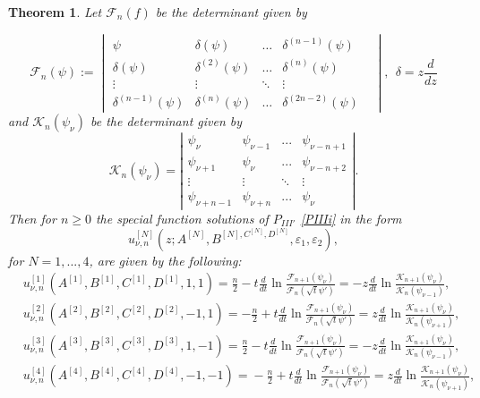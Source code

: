 \documentclass[12pt]{article}
\def\F{\mathcal{F}}
\def\K{\mathcal{K}}
\newtheorem{mydef}{Theorem}[section]
\numberwithin{figure}{section}
\numberwithin{equation}{section}
\numberwithin{table}{section}
\begin{document}
\begin{mydef}
Let $\F_{n}(f)$ be the determinant given by

\[
\mathcal{F}_n(\psi)\!:=\!\begin{vmatrix}
\psi & \delta(\psi) &\hdots& \delta^{(n-1)}(\psi) \\
\delta(\psi) & \delta^{(2)}(\psi) &\hdots& \delta^{(n)}(\psi)  \\
\vdots &\vdots & \ddots & \vdots & \\
\delta^{(n-1)}(\psi) & \delta^{(n)}(\psi) &\hdots& \delta^{(2n-2)}(\psi)
\end{vmatrix},~~\delta=z\frac{d}{dz}
\]
and $\mathcal{K}_n(\psi_\nu)$ be the determinant given by
\[
\mathcal{K}_n(\psi_\nu)\!=\!\left| \begin{array}{cccc}
\psi_{\nu} & \psi_{\nu-1} &  ...& \psi_{\nu-n+1} \\
\psi_{\nu+1} & \psi_{\nu} &  ...& \psi_{\nu-n+2} \\
\vdots &\vdots & \ddots & \vdots  \\
\psi_{\nu+n-1} & \psi_{\nu+n} & ...& \psi_{\nu}  \end{array} \right|.
\]
Then for $n\geq0$ the special function solutions of $P_{III'}$ \eqref{PIIIi} in the form $$u^{[N]}_{\nu,n}(z;A^{[N]},B^{[N],C^{[N]},D^{[N]}},\varepsilon_1,\varepsilon_2),$$ for $N=1,...,4$, are given by the following:
\begin{subequations}
\begin{align*}
&u^{[1]}_{\nu,n}(A^{[1]},B^{[1]},C^{[1]},D^{[1]},1,1)=\tfrac{n}{2}-t\frac{d}{dt}\ln\frac{\F_{n+1}(\psi_\nu)}{\F_n({\sqrt{t}\psi'})}=-z\frac{d}{dt}\ln\frac{\K_{n+1}(\psi_\nu)}{\K_{n}(\psi_{\nu-1})},\\
&u^{[2]}_{\nu,n}(A^{[2]},B^{[2]},C^{[2]},D^{[2]},-1,1)=-\tfrac{n}{2}+t\frac{d}{dt}\ln\frac{\F_{n+1}(\psi_\nu)}{\F_n({\sqrt{t}\psi'})}=z\frac{d}{dt}\ln\frac{\K_{n+1}(\psi_\nu)}{\K_{n}(\psi_{\nu+1})},\\
&u^{[3]}_{\nu,n}(A^{[3]},B^{[3]},C^{[3]},D^{[3]},1,-1)=\tfrac{n}{2}-t\frac{d}{dt}\ln\frac{\F_{n+1}(\psi_\nu)}{\F_n({\sqrt{t}\psi'})}=-z\frac{d}{dt}\ln\frac{\K_{n+1}(\psi_\nu)}{\K_{n}(\psi_{\nu-1})},\\
&u^{[4]}_{\nu,n}(A^{[4]},B^{[4]},C^{[4]},D^{[4]},-1,-1)=\!-\tfrac{n}{2}\!+\!t\frac{d}{dt}\ln\frac{\F_{n+1}(\psi_\nu)}{\F_n({\sqrt{t}\psi'})}\!=\!z\frac{d}{dt}\ln\frac{\K_{n+1}(\psi_\nu)}{\K_{n}(\psi_{\nu+1})},
\end{align*}
\end{subequations}
\end{mydef}
\end{document}
